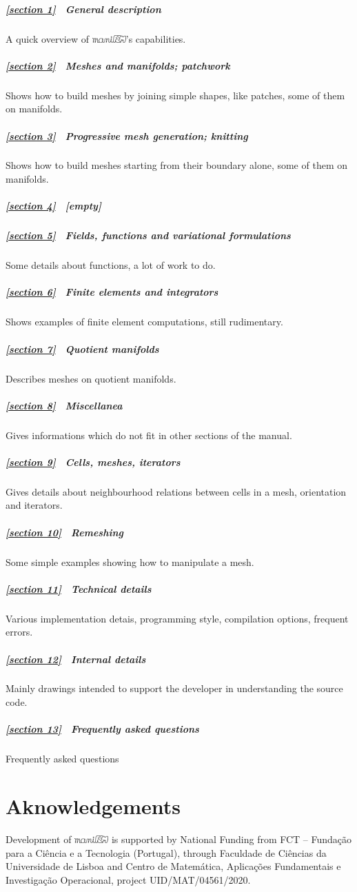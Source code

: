 \documentclass[a4paper]{scrreprt}
\def\numb{}
\newcommand\maniFEM{\leavevmode\hbox{\includegraphics[width=13mm]{manifem-small}}}
\newcommand\cinzasec[1]{\textcolor{comentsec}{#1}}
\begin{document}
\subparagraph*{\ref{\numb section 1} \ General description}
A quick overview of \maniFEM's capabilities.

\subparagraph*{\ref{\numb section 2} \ Meshes and manifolds; patchwork}
Shows how to build meshes by joining simple shapes, like patches, some of them on manifolds.

\subparagraph*{\ref{\numb section 3} \ Progressive mesh generation; knitting}
Shows how to build meshes starting from their boundary alone, some of them on manifolds.

\subparagraph*{\ref{\numb section 4} \ \cinzasec{[empty]}}

\subparagraph*{\ref{\numb section 5} \ Fields, functions and variational formulations}
Some details about functions, a lot of work to do.

\subparagraph*{\ref{\numb section 6} \ Finite elements and integrators}
Shows examples of finite element computations, still rudimentary.

\subparagraph*{\ref{\numb section 7} \ Quotient manifolds}
Describes meshes on quotient manifolds.

\subparagraph*{\ref{\numb section 8} \ Miscellanea}
Gives informations which do not fit in other sections of the manual.

\subparagraph*{\ref{\numb section 9} \ Cells, meshes, iterators}
Gives details about neighbourhood relations between cells in a mesh, orientation and iterators.

\subparagraph*{\ref{\numb section 10} \ Remeshing}
Some simple examples showing how to manipulate a mesh.

\subparagraph*{\ref{\numb section 11} \ Technical details}
Various implementation detais, programming style, compilation options, frequent errors.

\subparagraph*{\ref{\numb section 12} \ Internal details}
Mainly drawings intended to support the developer in understanding the source code.

\subparagraph*{\ref{\numb section 13} \ Frequently asked questions}
Frequently asked questions
\vfil\eject


\section*{Aknowledgements}

Development of {\maniFEM} is supported by National Funding from FCT -- Funda\c c\~ao
para a Ci\^encia e a Tecnologia (Portugal), through Faculdade de Ci\^encias da Universidade
de Lisboa and Centro de Matem\'atica, Aplica\c c\~oes Fundamentais e Investiga\c c\~ao
Operacional, project UID/MAT/04561/2020.
\end{document}
